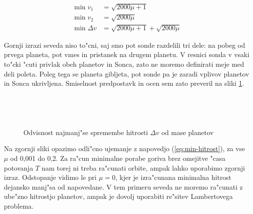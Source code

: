 \documentclass[a4paper,10pt]{article}
\begin{document}
\begin{align}
 \min v_1 &= \sqrt{2000\mu + 1} \\
 \min v_2 &= \sqrt{2000\mu} \\
 \min \Delta v &= \sqrt{2000\mu + 1} + \sqrt{2000\mu} \label{eq:min-hitrost}
\end{align}

Gornji izrazi seveda niso to"cni, saj smo pot sonde razdelili tri dele: na pobeg od prvega planeta, pot vmes in pristanek na drugem planetu. V resnici sonda v vsaki to"cki "cuti privlak obeh planetov in Sonca, zato ne moremo definirati meje med deli poleta. Poleg tega se planeta gibljeta, pot sonde pa je zaradi vplivov planetov in Sonca ukrivljena. Smiselnost predpostavk in ocen sem zato preveril na sliki \ref{fig:hitrosti}. 

\begin{landscape}
 \begin{figure}[H]
  \subfigure[$\mu = 0$]{}
  \subfigure[$\mu = 0,\!001$]{} \\
  \subfigure[$\mu = 0,\!01$]{}
  \subfigure[$\mu = 0,\!1$]{}
 \end{figure}
\end{landscape}
\restoregeometry

\begin{landscape}
 \begin{figure}[H]
  \subfigure[$\mu = 0$]{}
  \subfigure[$\mu = 0,\!001$]{} \\
  \subfigure[$\mu = 0,\!01$]{}
  \subfigure[$\mu = 0,\!1$]{}
 \end{figure}
\end{landscape}
\restoregeometry

\begin{figure}[H]
 
 \caption{Odvisnost najmanj"se spremembe hitrosti $\Delta v$ od mase planetov}
 \label{fig:hitrosti}
\end{figure}

Na zgornji sliki opazimo odli"cno ujemanje z napovedjo (\ref{eq:min-hitrost}), za vse $\mu$ od 0,001 do 0,2. Za ra"cun minimalne porabe goriva brez omejitve "casa potovanja $T$ nam torej ni treba ra"cunati orbite, ampak lahko uporabimo zgornji izraz. Odstopanje vidimo le pri $\mu=0$, kjer je izra"cunana minimalna hitrost dejansko manj"sa od napovedane. V tem primeru seveda ne moremo ra"cunati z ube"zno hitrostjo planetov, ampak je dovolj uporabiti re"sitev Lambertovega problema. 
\end{document}

